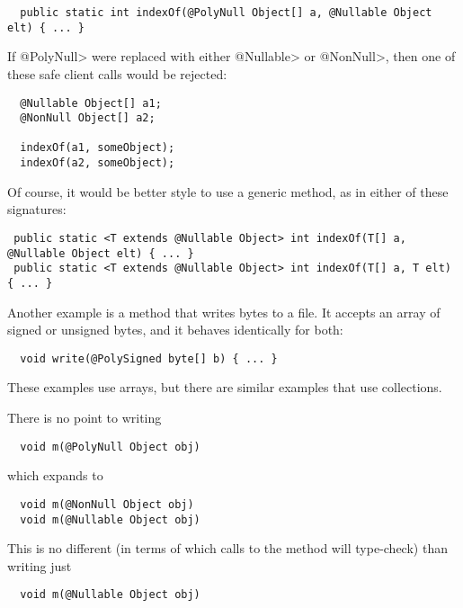 \begin{Verbatim}
  public static int indexOf(@PolyNull Object[] a, @Nullable Object elt) { ... }
\end{Verbatim}

If \<@PolyNull> were replaced with either \<@Nullable> or \<@NonNull>, then
one of these safe client calls would be rejected:

\begin{Verbatim}
  @Nullable Object[] a1;
  @NonNull Object[] a2;

  indexOf(a1, someObject);
  indexOf(a2, someObject);
\end{Verbatim}

Of course, it would be better style to use a generic method, as in either
of these signatures:

\begin{Verbatim}
 public static <T extends @Nullable Object> int indexOf(T[] a, @Nullable Object elt) { ... }
 public static <T extends @Nullable Object> int indexOf(T[] a, T elt) { ... }
\end{Verbatim}


Another example is a method that writes bytes to a file.  It accepts an
array of signed or unsigned bytes, and it behaves identically for both:

\begin{Verbatim}
  void write(@PolySigned byte[] b) { ... }
\end{Verbatim}


These examples use arrays, but there are similar examples that
use collections.



There is no point to writing

\begin{Verbatim}
  void m(@PolyNull Object obj)
\end{Verbatim}

\noindent
which expands to

\begin{Verbatim}
  void m(@NonNull Object obj)
  void m(@Nullable Object obj)
\end{Verbatim}

This is no different (in terms of which calls to the method will
type-check) than writing just

\begin{Verbatim}
  void m(@Nullable Object obj)
\end{Verbatim}

